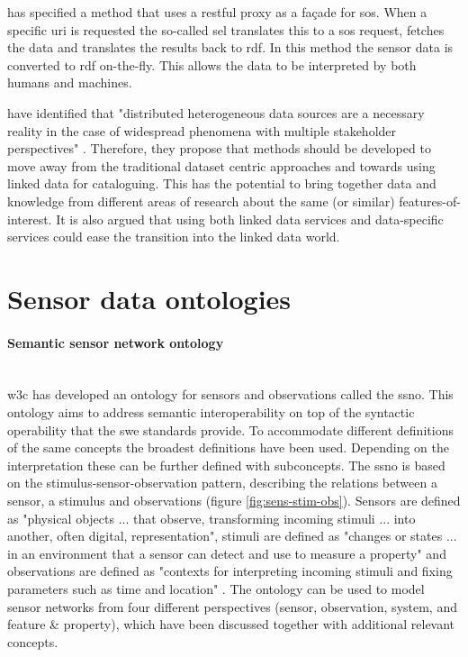 \cite{SSW:Janowicz} has specified a method that uses a \ac{rest}ful proxy as a fa\c{c}ade for \ac{sos}. When a specific \ac{uri} is requested the so-called \ac{sel} translates this to a \ac{sos} request, fetches the data and translates the results back to \ac{rdf}. In this method the sensor data is converted to \ac{rdf} on-the-fly. This allows the data to be interpreted by both humans and machines.  

\cite{SSW:Atkinson} have identified that "distributed heterogeneous data sources are a necessary reality in the case of widespread
phenomena with multiple stakeholder perspectives" \cite[p.129]{SSW:Atkinson}. Therefore, they propose that methods should be developed to move away from the traditional dataset centric approaches and towards using linked data for cataloguing. This has the potential to bring together data and knowledge from different areas of research about the same (or similar) features-of-interest. It is also argued that using both linked data services and data-specific services could ease the transition into the linked data world.  

\section{Sensor data ontologies}
\paragraph{Semantic sensor network ontology} \mbox{}\\
 \ac{w3c} has developed an ontology for sensors and observations called the \ac{ssno}. This ontology aims to address semantic interoperability on top of the syntactic operability that the \ac{swe} standards provide. To accommodate different definitions of the same concepts the broadest definitions have been used. Depending on the interpretation these can be further defined with subconcepts. The \ac{ssno} is based on the stimulus-sensor-observation pattern, describing the relations between a sensor, a stimulus and observations (figure \ref{fig:sens-stim-obs}). Sensors are defined as "physical objects ... that observe, transforming incoming stimuli ... into another, often digital, representation", stimuli are defined as "changes or states ... in an environment that a sensor can detect and use to measure a property" and observations are defined as "contexts for interpreting incoming stimuli and fixing parameters such as time and location" \cite[p 28]{SSW:SSN_incubatorGroup}. The ontology can be used to model sensor networks from four different perspectives (sensor, observation, system, and feature \& property), which have been discussed together with additional relevant concepts.

